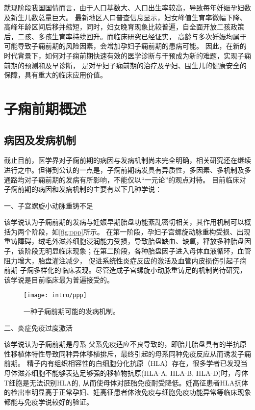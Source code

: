 就现阶段我国国情而言，由于人口基数大、人口出生率较高，导致每年妊娠孕妇数及新生儿数总量巨大\cite{nbs2022}。
最新地区人口普查信息显示，妇女峰值生育率微幅下降、高峰年龄区间后移并缩短，同时，妇女晚育现象比较普遍，自全面开放二孩政策后，二孩、多孩生育率持续回升\cite{zjtjj2022}。而临床研究已经证实，
高龄与多次妊娠均属于可能导致子痫前期的风险因素，会增加孕妇子痫前期的患病可能\cite{Duckitt2005,FIGO,Yogev2010,Poon2010,Lee2000,Coonrod1995,Robillard1993}。
因此，在新的时代背景下，如何对子痫前期快速有效的医学诊断与干预成为新的难题，实现子痫前期的预测和及早诊断，
是对孕妇子痫前期的治疗及孕妇、围生儿的健康安全的保障，具有重大的临床应用价值。
\section{子痫前期概述}
\subsection{病因及发病机制}
截止目前，医学界对子痫前期的病因与发病机制尚未完全明确，相关研究还在继续进行之中。但得到公认的一点是，子痫前期病发具有异质性，多因素、多机制及多通路均对子痫前期的发病有所影响，不能仅以“一元论”的观点对待。
目前临床对子痫前期的病因和发病机制的主要有以下几种学说：

一、子宫螺旋小动脉重铸不足

该学说认为子痫前期的发病与妊娠早期胎盘功能紊乱密切相关\cite{OAG9,Duvekot2010,2009ix}，其作用机制可以概括为两个阶段，如\autoref{fig:ppp}所示。
在第一阶段，孕妇子宫螺旋动脉重构受损、出现重铸障碍，绒毛外滋养细胞浸润能力受损，导致胎盘缺血、缺氧，释放多种胎盘因子，该阶段无明显临床现象；在第二阶段，各种胎盘因子进入母体血液循环，血管阻力增大，胎盘灌注减少，
促进系统性炎症反应的激活及血管内皮损伤引起子痫前期-子痫多样化的临床表现。尽管造成子宫螺旋小动脉重铸足的机制尚待研究，该学说是目前临床最为普遍接受的。
\begin{figure}[htbp]
    \centering
    \texttt{[image: intro/ppp]}
    \caption[一种子痫前期可能的发病机制]{\label{fig:ppp}一种子痫前期可能的发病机制\cite{Duvekot2010,2009ix}。}
\end{figure}

二、炎症免疫过度激活

该学说认为子痫前期是母系-父系免疫适应不良导致的\cite{Sibai2005,OAG9,Shi2006}，即胎儿胎盘具有的半抗原性移植体特性导致同种异体移植排斥，最终引起的母系同种免疫反应从而诱发子痫前期。
精子内有组织相容性的白细胞分化抗原（HLA）存在，很多学者已发现当母体滋养细胞不能够表达足够强的移植物抗原(HLA-A, HLA-B, HLA-D)\cite{Moffett2002}时，母体T细胞是无法识别HLA的,
从而使母体对胚胎免疫耐受降低。妊高征患者HLA抗体的检出率明显高于正常孕妇、妊高征患者体液免疫与细胞免疫功能异常等临床现象都能与免疫学说较好的验证。

